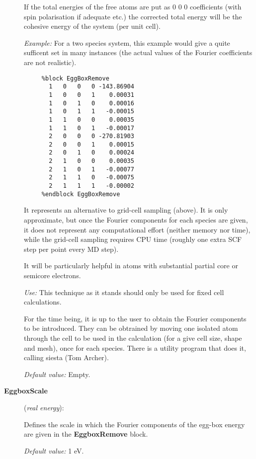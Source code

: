 \documentclass[11pt]{article}
\begin{document}
\begin{description}
If the total
energies of the free atoms are put as 0 0 0 coefficients (with
spin polarisation if adequate etc.) the corrected total energy
will be the cohesive energy of the system (per unit cell).

{\it Example:} For a two species system, this example would give a quite
sufficent set in many instances (the actual values of the Fourier 
coefficients are not realistic).

\begin{verbatim}
     %block EggBoxRemove
       1   0   0   0 -143.86904
       1   0   0   1    0.00031
       1   0   1   0    0.00016
       1   0   1   1   -0.00015
       1   1   0   0    0.00035
       1   1   0   1   -0.00017
       2   0   0   0 -270.81903
       2   0   0   1    0.00015
       2   0   1   0    0.00024
       2   1   0   0    0.00035
       2   1   0   1   -0.00077
       2   1   1   0   -0.00075
       2   1   1   1   -0.00002
     %endblock EggBoxRemove
\end{verbatim}

It represents an alternative to grid-cell sampling (above).
It is only approximate, but once the Fourier components for each 
species are given, it does not represent any computational 
effort (neither memory nor time), while the grid-cell sampling
requires CPU time (roughly one extra SCF step per point every
MD step).

It will be particularly helpful in atoms with substantial partial
core or semicore electrons.

{\it Use:} This technique as it stands should only be used for fixed cell 
calculations. 

For the time being, it is up to the user to obtain the Fourier
components to be introduced. They can be obtrained by moving one
isolated atom through the cell to be used in the calculation
(for a give cell size, shape and mesh), once for each species. 
There is a utility program that does it, calling siesta (Tom Archer).

{\it Default value:} Empty.


\item[{\bf EggboxScale}] ({\it real energy}):

Defines the scale in which the Fourier components of the 
egg-box energy are given in the {\bf EggboxRemove} block.

{\it Default value:} 1 eV.

\end{description}
\end{document}
